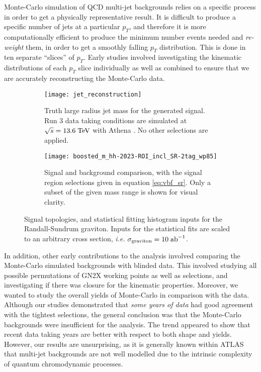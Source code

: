 \documentclass[12pt]{article}
\begin{document}
Monte-Carlo simulation of QCD multi-jet backgrounds relies on a specific process
in order to get a physically representative result. It is difficult to produce a
specific number of jets at a particular $p_T$, and therefore it is more
computationally efficient to produce the minimum number events needed and
\textit{re-weight} them, in order to get a smoothly falling $p_T$ distribution.
This is done in ten separate ``slices'' of $p_T$. Early studies involved
investigating the kinematic distributions of each $p_T$ slice individually as
well as combined to ensure that we are accurately reconstructing the Monte-Carlo
data.

\begin{figure}[t]
    \centering
    \begin{subfigure}[t]{.48\textwidth}
        \centering
        \texttt{[image: jet\_reconstruction]}
        \caption{Truth large radius jet mass for the generated signal. Run 3
        data taking conditions are simulated at $\sqrt{s}=13.6\;\text{TeV}$ with
        Athena \cite{atlas_simulation}. No other selections are applied.}
        \label{subfig:jet_reconstruction}
    \end{subfigure}
    \hfill
    \begin{subfigure}[t]{.48\textwidth}
        \centering
        \texttt{[image: boosted\_m\_hh-2023-ROI\_incl\_SR-2tag\_wp85]}
        \caption{Signal and background comparison, with the signal region
        selections given in equation \ref{eq:vbf_sr}. Only a subset of the given
        mass range is shown for visual clarity.}
        \label{subfig:input_hists}
    \end{subfigure}
    \caption{Signal topologies, and statistical fitting histogram inputs for the
    Randall-Sundrum graviton. Inputs for the statistical fits are scaled to an
    arbitrary cross section, \textit{i.e.}
    $\sigma_{\text{graviton}}=10\;\text{ab}^{-1}$.}
\label{fig:my_contributions}
\end{figure}

In addition, other early contributions to the analysis involved comparing the
Monte-Carlo simulated backgrounds with blinded data. This involved studying all
possible permutations of GN2X working points as well as selections, and
investigating if there was closure for the kinematic properties. Moreover, we
wanted to study the overall yields of Monte-Carlo in comparison with the data. Although our
studies demonstrated that \textit{some years of data} had good agreement with
the tightest selections, the general conclusion was that the Monte-Carlo
backgrounds were insufficient for the analysis. The trend appeared to show that
recent data taking years are better with respect to both shape and yields.
However, our results are unsurprising, as it is generally known within ATLAS
that multi-jet backgrounds are not well modelled due to the intrinsic
complexity of quantum chromodynamic processes.
\end{document}
